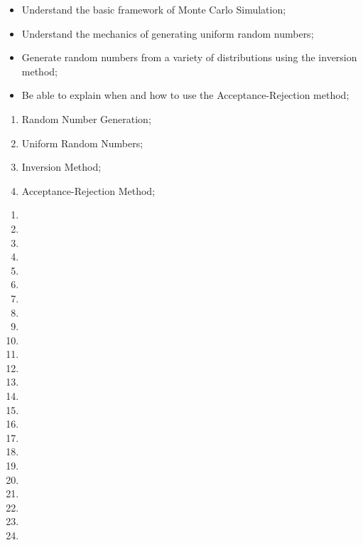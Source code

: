 \begin{outcomes}
\begin{enumerate}
		\begin{itemize}
		\item	Understand the basic framework of Monte Carlo Simulation;
		\item	Understand the mechanics of generating uniform random numbers;
		\item	Generate random numbers from a variety of distributions using the inversion method;
		\item	Be able to explain when and how to use the Acceptance-Rejection method;
		\end{itemize}
	\begin{knowledge}
	\begin{enumerate}[label = \alph*.]
		\item	Random Number Generation;
		\item	Uniform Random Numbers;
		\item	Inversion Method;
		\item	Acceptance-Rejection Method;
	\end{enumerate}
	\end{knowledge}
\end{enumerate}
\end{outcomes}

\begin{ASM_chapter}
\begin{enumerate}
	\item	{}
	\item	{}
	\item	{}
\tcbline
	\item	{}
	\item	{}
	\item	{}
	\item	{}
	\item	{}
	\item	{}
	\item	{}
	\item	{}
	\item	{}
	\item	{}
	\item	{}
	\item	{}
	\item	{}
	\item	{}
	\item	{}
	\item	{}
\tcbline
	\item	{}
	\item	{}
\tcbline
	\item	{}
	\item	{}
	\item	{}
\end{enumerate}
\end{ASM_chapter}

